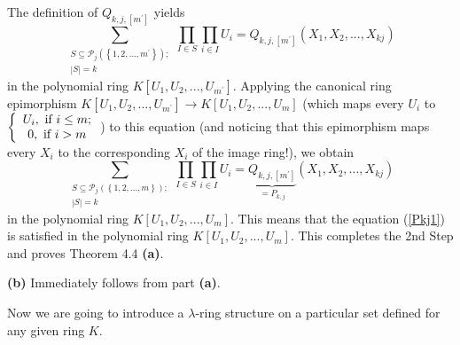 \documentclass[12pt,final,notitlepage,onecolumn,german]{article}%
\begin{document}
The definition of $Q_{k,j,\left[  m^{\prime}\right]  }$ yields
\[
\sum_{\substack{S\subseteq\mathcal{P}_{j}\left(  \left\{  1,2,...,m^{\prime
}\right\}  \right)  ;\\\left\vert S\right\vert =k}}\prod_{I\in S}\prod_{i\in
I}U_{i}=Q_{k,j,\left[  m^{\prime}\right]  }\left(  X_{1},X_{2},...,X_{kj}%
\right)
\]
in the polynomial ring $K\left[  U_{1},U_{2},...,U_{m^{\prime}}\right]  $.
Applying the canonical ring epimorphism $K\left[  U_{1},U_{2},...,U_{m^{\prime
}}\right]  \rightarrow K\left[  U_{1},U_{2},...,U_{m}\right]  $ (which maps
every $U_{i}$ to $\left\{
\begin{array}
[c]{c}%
U_{i},\text{ if }i\leq m;\\
0,\text{ if }i>m
\end{array}
\right.  $) to this equation (and noticing that this epimorphism maps every
$X_{i}$ to the corresponding $X_{i}$ of the image ring!), we obtain%
\[
\sum_{\substack{S\subseteq\mathcal{P}_{j}\left(  \left\{  1,2,...,m\right\}
\right)  ;\\\left\vert S\right\vert =k}}\prod_{I\in S}\prod_{i\in I}%
U_{i}=\underbrace{Q_{k,j,\left[  m^{\prime}\right]  }}_{=P_{k,j}}\left(
X_{1},X_{2},...,X_{kj}\right)
\]
in the polynomial ring $K\left[  U_{1},U_{2},...,U_{m}\right]  .$ This means
that the equation (\ref{Pkj1}) is satisfied in the polynomial ring $K\left[
U_{1},U_{2},...,U_{m}\right]  .$ This completes the 2nd Step and proves
Theorem 4.4 \textbf{(a)}.

\textbf{(b)} Immediately follows from part \textbf{(a)}.

\begin{center}
\end{center}

Now we are going to introduce a $\lambda$-ring structure on a particular set
defined for any given ring $K.$
\end{document}
